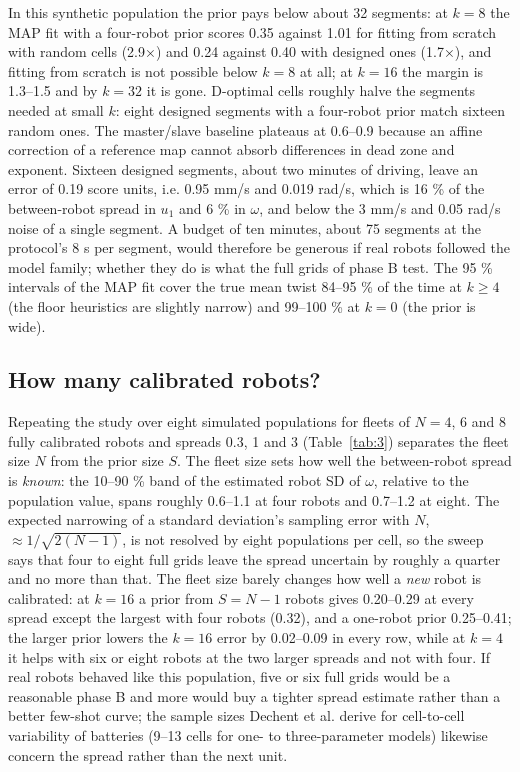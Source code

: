 In this synthetic population the prior pays below about 32 segments: at
\(k = 8\) the MAP fit with a four-robot prior scores 0.35 against 1.01
for fitting from scratch with random cells (2.9×) and 0.24 against 0.40
with designed ones (1.7×), and fitting from scratch is not possible
below \(k = 8\) at all; at \(k = 16\) the margin is 1.3--1.5 and by
\(k = 32\) it is gone. D-optimal cells roughly halve the segments needed
at small \(k\): eight designed segments with a four-robot prior match
sixteen random ones. The master/slave baseline plateaus at 0.6--0.9
because an affine correction of a reference map cannot absorb
differences in dead zone and exponent. Sixteen designed segments, about
two minutes of driving, leave an error of 0.19 score units, i.e. 0.95
mm/s and 0.019 rad/s, which is 16 \% of the between-robot spread in
\(u_1\) and 6 \% in \(\omega\), and below the 3 mm/s and 0.05 rad/s
noise of a single segment. A budget of ten minutes, about 75 segments at
the protocol's 8 s per segment, would therefore be generous if real
robots followed the model family; whether they do is what the full grids
of phase B test. The 95 \% intervals of the MAP fit cover the true mean
twist 84--95 \% of the time at \(k \ge 4\) (the floor heuristics are
slightly narrow) and 99--100 \% at \(k = 0\) (the prior is wide).

\subsection{How many calibrated
robots?}\label{sec:sim-power}

Repeating the study over eight simulated populations for fleets of
\(N = 4\), 6 and 8 fully calibrated robots and spreads 0.3, 1 and 3
(Table~\ref{tab:3}) separates the fleet size \(N\) from the prior size
\(S\). The fleet size sets how well the between-robot spread is
\emph{known}: the 10--90 \% band of the estimated robot SD of \(\omega\),
relative to the population value, spans roughly 0.6--1.1 at four robots
and 0.7--1.2 at eight. The expected narrowing of a standard deviation's
sampling error with \(N\), \(\approx 1/\sqrt{2(N-1)}\), is not resolved
by eight populations per cell, so the sweep says that four to eight
full grids leave the spread uncertain by roughly a quarter and no more
than that. The fleet size barely changes how well a \emph{new} robot is
calibrated: at \(k = 16\) a prior from \(S = N-1\) robots gives
0.20--0.29 at every spread except the largest with four robots (0.32),
and a one-robot prior 0.25--0.41; the larger prior lowers the \(k = 16\)
error by 0.02--0.09 in every row, while at \(k = 4\) it helps with six
or eight robots at the two larger spreads and not with four. If real
robots behaved like this population, five or six full grids would be a
reasonable phase B and more would buy a tighter spread estimate rather
than a better few-shot curve; the sample sizes Dechent et al.
\cite{dechent2021samplesize} derive for cell-to-cell variability of
batteries (9--13 cells for one- to three-parameter models) likewise
concern the spread rather than the next unit.

